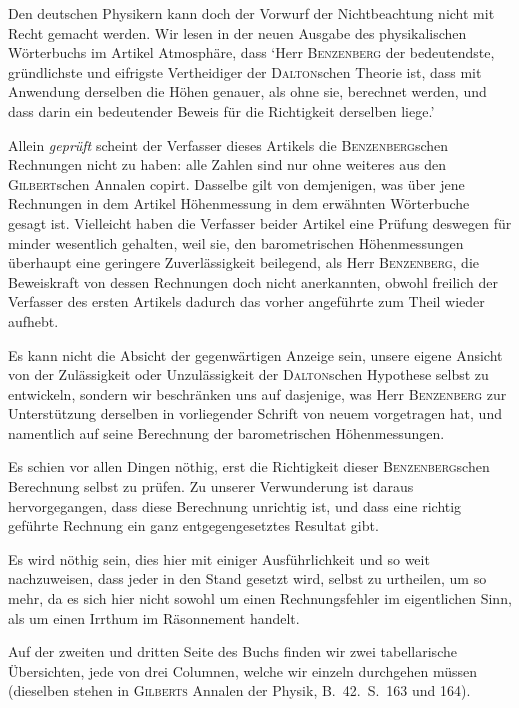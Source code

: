 Den deutschen Physikern kann doch der Vorwurf der Nichtbeachtung nicht mit Recht gemacht werden. Wir lesen in der neuen Ausgabe des physikalischen Wörterbuchs im Artikel Atmosphäre, dass `Herr \textsc{Benzenberg} der bedeutendste, gründlichste und eifrigste Vertheidiger der \textsc{Dalton}schen Theorie ist, dass mit Anwendung derselben die Höhen genauer, als ohne sie, berechnet werden, und dass darin ein bedeutender Beweis für die Richtigkeit derselben liege.'

Allein \textit{geprüft} scheint der Verfasser dieses Artikels die \textsc{Benzenberg}schen Rechnungen nicht zu haben: alle Zahlen sind nur ohne weiteres aus den \textsc{Gilbert}schen Annalen copirt. Dasselbe gilt von demjenigen, was über jene Rechnungen in dem Artikel Höhenmessung in dem erwähnten Wörterbuche gesagt ist. Vielleicht haben die Verfasser beider Artikel eine Prüfung deswegen für minder wesentlich gehalten, weil sie, den barometrischen Höhenmessungen überhaupt eine geringere Zuverlässigkeit beilegend, als Herr \textsc{Benzenberg}, die Beweiskraft von dessen Rechnungen doch nicht anerkannten, obwohl freilich der Verfasser des ersten Artikels dadurch das vorher angeführte zum Theil wieder aufhebt.

Es kann nicht die Absicht der gegenwärtigen Anzeige sein, unsere eigene Ansicht von der Zulässigkeit oder Unzulässigkeit der \textsc{Dalton}schen Hypothese selbst zu entwickeln, sondern wir beschränken uns auf dasjenige, was Herr \textsc{Benzenberg} zur Unterstützung derselben in vorliegender Schrift von neuem vorgetragen hat, und namentlich auf seine Berechnung der barometrischen Höhenmessungen.

Es schien vor allen Dingen nöthig, erst die Richtigkeit dieser \textsc{Benzenberg}schen Berechnung selbst zu prüfen. Zu unserer Verwunderung ist daraus hervorgegangen, dass diese Berechnung unrichtig ist, und dass eine richtig geführte Rechnung ein ganz entgegengesetztes Resultat gibt.

Es wird nöthig sein, dies hier mit einiger Ausführlichkeit und so weit nachzuweisen, dass jeder in den Stand gesetzt wird, selbst zu urtheilen, um so mehr, da es sich hier nicht sowohl um einen Rechnungsfehler im eigentlichen Sinn, als um einen Irrthum im Räsonnement handelt.

Auf der zweiten und dritten Seite des Buchs finden wir zwei tabellarische Übersichten, jede von drei Columnen, welche wir einzeln durchgehen müssen (dieselben stehen in \textsc{Gilberts} Annalen der Physik, B.\ 42.\ S.\ 163 und 164).

